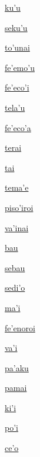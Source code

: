 {\hyperlink{val:kuhu}{ku'u}}{}{}{}

{\hyperlink{val:sekuhu}{seku'u}}{}{}{}

{\hyperlink{val:tohunai}{to'unai}}{}{}{}

{\hyperlink{val:fehemohu}{fe'emo'u}}{}{}{}

{\hyperlink{val:fehecohi}{fe'eco'i}}{}{}{}

{\hyperlink{val:telahu}{tela'u}}{}{}{}

{\hyperlink{val:fehecoha}{fe'eco'a}}{}{}{}

{\hyperlink{val:terai}{terai}}{}{}{}

{\hyperlink{val:tai}{tai}}{}{}{}

{\hyperlink{val:temahe}{tema'e}}{}{}{}

{\hyperlink{val:pisohiroi}{piso'iroi}}{}{}{}

{\hyperlink{val:vahinai}{va'inai}}{}{}{}

{\hyperlink{val:bau}{bau}}{}{}{}

{\hyperlink{val:sebau}{sebau}}{}{}{}

{\hyperlink{val:sediho}{sedi'o}}{}{}{}

{\hyperlink{val:mahi}{ma'i}}{}{}{}

{\hyperlink{val:fehenoroi}{fe'enoroi}}{}{}{}

{\hyperlink{val:vahi}{va'i}}{}{}{}

{\hyperlink{val:pahaku}{pa'aku}}{}{}{}

{\hyperlink{val:pamai}{pamai}}{}{}{}

{\hyperlink{val:kihi}{ki'i}}{}{}{}

{\hyperlink{val:pohi}{po'i}}{}{}{}

{\hyperlink{val:ceho}{ce'o}}{}{}{}

